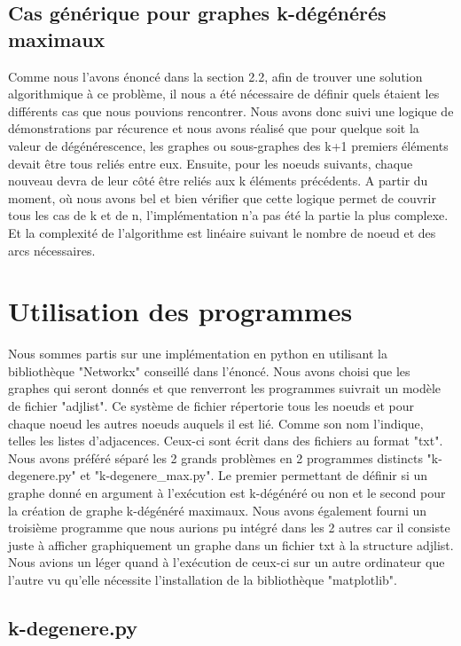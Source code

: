 \documentclass[a4paper, 11pt, oneside]{article}
\begin{document}
\subsection{Cas générique pour graphes k-dégénérés maximaux}

Comme nous l'avons énoncé dans la section 2.2, afin de trouver une solution 
algorithmique à ce problème, il nous a été nécessaire de définir quels étaient 
les différents cas que nous pouvions rencontrer. Nous avons donc suivi une logique 
de démonstrations par récurence et nous avons réalisé que pour quelque soit la valeur 
de dégénérescence, les graphes ou sous-graphes des k+1 premiers éléments devait être 
tous reliés entre eux. Ensuite, pour les noeuds suivants, chaque nouveau devra 
de leur côté être reliés aux k éléments précédents. A partir du moment, où nous avons 
bel et bien vérifier que cette logique permet de couvrir tous les cas de k et de n, 
l'implémentation n'a pas été la partie la plus complexe. Et la complexité de 
l'algorithme est linéaire suivant le nombre de noeud et des arcs nécessaires. 

\section{\textbf{Utilisation des programmes}}
Nous sommes partis sur une implémentation en python en utilisant la 
bibliothèque "Networkx" conseillé dans l'énoncé. Nous avons choisi que les graphes 
qui seront donnés et que renverront les programmes suivrait un modèle de fichier 
"adjlist". Ce système de fichier répertorie tous les noeuds et pour chaque noeud 
les autres noeuds auquels il est lié. Comme son nom l'indique, telles les listes 
d'adjacences. Ceux-ci sont écrit dans des fichiers au format "txt".
\\Nous avons préféré séparé les 2 grands problèmes en 2 programmes distincts 
"k-degenere.py" et "k-degenere\_max.py". Le premier permettant de définir si un graphe 
donné en argument à l'exécution est k-dégénéré ou non et le second pour la création 
de graphe k-dégénéré maximaux.
Nous avons également fourni un troisième programme que nous aurions pu intégré dans les 2 
autres car il consiste juste à afficher graphiquement un graphe dans un fichier txt à la structure 
adjlist. Nous avions un léger quand à l'exécution de ceux-ci sur un autre ordinateur 
que l'autre vu qu'elle nécessite l'installation de la bibliothèque "matplotlib".

\subsection{k-degenere.py}
\end{document}
